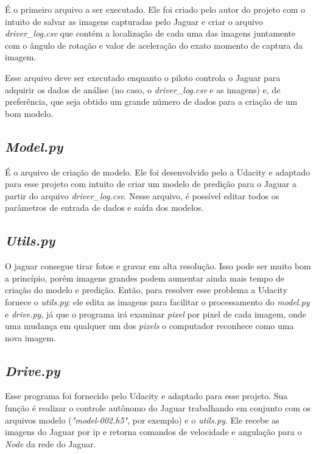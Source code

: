 É o primeiro arquivo a ser executado. Ele foi criado pelo autor do projeto com o intuito de salvar as imagens capturadas pelo Jaguar e criar o arquivo \textit{driver\_log.csv} que contém a localização de cada uma das imagens juntamente com o ângulo de rotação e valor de aceleração do exato momento de captura da imagem. 


Esse arquivo deve ser executado enquanto o piloto controla o Jaguar para adquirir os dados de análise (no caso, o \textit{driver\_log.csv} e as imagens) e, de preferência, que seja obtido um grande número de dados para a criação de um bom modelo. 

\subsection{\textit{Model.py}}

É o arquivo de criação de modelo. 
Ele foi desenvolvido pelo a Udacity e adaptado para esse projeto com intuito de criar um modelo de predição para o Jaguar a partir do arquivo \textit{driver\_log.csv}. Nesse arquivo, é possível editar todos os parâmetros de entrada de dados e saída dos modelos. 

\subsection{\textit{Utils.py}}

 O jaguar consegue tirar fotos e gravar em alta resolução. Isso pode ser muito bom a princípio, porém imagens grandes podem aumentar ainda mais tempo de criação do modelo e predição. Então, para resolver esse problema a Udacity fornece o \textit{utils.py}: ele edita as imagens para facilitar o processamento do \textit{model.py} e \textit{drive.py}, já que o programa irá examinar \textit{pixel} por pixel de cada imagem, onde uma mudança em qualquer um dos \textit{pixels} o computador reconhece como uma nova imagem.

\subsection{\textit{Drive.py}}

Esse programa foi fornecido pelo Udacity e adaptado para esse projeto. Sua função é realizar o controle autônomo do Jaguar trabalhando em conjunto com os arquivos modelo (\textit{"model-002.h5"}, por exemplo) e o \textit{utils.py}. Ele recebe as imagens do Jaguar por ip e retorna comandos de velocidade e angulação para o \textit{Node} da rede do Jaguar. 

